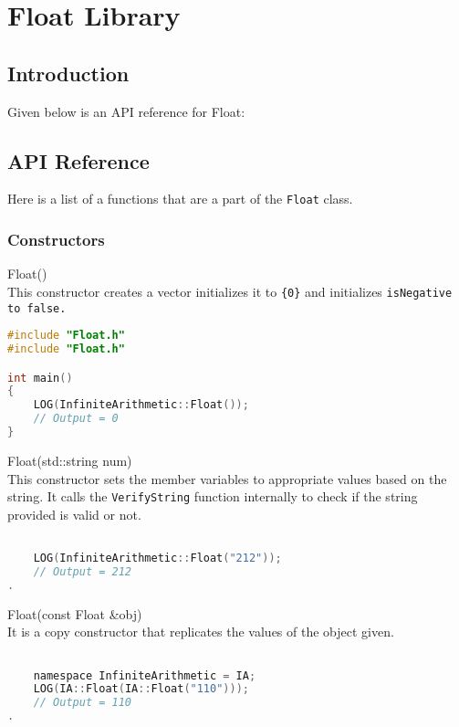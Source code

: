 
\section{Float Library}

\subsection{Introduction}

Given below is an API reference for Float:

\subsection{API Reference}

Here is a list of a functions that are a part of the \verb|Float| class. 

\subsubsection{Constructors} \vspace*{1em}

{\ttfamily \large Float()} \\[2mm]
This constructor creates a vector initializes it to \verb|{0}| and initializes \tt{isNegative} to \tt{false}.
\vspace*{1em}
\begin{lstlisting}[language = C]
#include "Float.h"
#include "Float.h"

int main()
{
	LOG(InfiniteArithmetic::Float());
	// Output = 0
}
\end{lstlisting}
\vspace*{1em}


\noindent
{\ttfamily \large Float(std::string num)} \\[2mm]
This constructor sets the member variables to appropriate values based on the string. It calls the \verb|VerifyString| function internally to check if the string provided is valid or not.
\vspace*{1em}
\begin{lstlisting}[language = C]

	LOG(InfiniteArithmetic::Float("212"));
	// Output = 212
.
\end{lstlisting}
\vspace*{1em}


\noindent
{\ttfamily \large Float(const Float \&obj)} \\[2mm]
It is a copy constructor that replicates the values of the object given.
\vspace*{1em}
\begin{lstlisting}[language = C]

	namespace InfiniteArithmetic = IA;
	LOG(IA::Float(IA::Float("110")));
	// Output = 110
.
\end{lstlisting}
\vspace*{1em}


